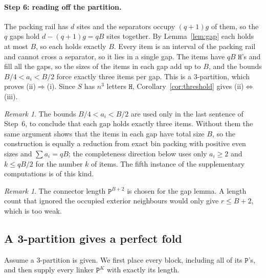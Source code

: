 \documentclass[11pt,letterpaper]{article}
\theoremstyle{definition}
\theoremstyle{remark}
\newtheorem{remark}[theorem]{Remark}
\newcommand{\Hh}{\mathtt{H}}
\newcommand{\Pp}{\mathtt{P}}
\begin{document}
\paragraph{Step 6: reading off the partition.}
The packing rail has $d$ sites and the separators occupy $(q+1)g$ of them, so the $q$ gaps hold
$d-(q+1)g=qB$ sites together. By Lemma~\ref{lem:gap} each holds at most $B$, so each holds exactly
$B$. Every item is an interval of the packing rail and cannot cross a separator, so it lies in a
single gap. The items have $qB$ $\Hh$'s and fill all the gaps, so the sizes of the items in each gap
add up to $B$, and the bounds $B/4<a_i<B/2$ force exactly three items per gap. This is a
3-partition, which proves (ii)$\Rightarrow$(i). Since $S$ has $n^3$ letters $\Hh$,
Corollary~\ref{cor:threshold} gives (ii)$\Leftrightarrow$(iii).

\begin{remark}\label{rem:exact}
The bounds $B/4<a_i<B/2$ are used only in the last sentence of Step~6, to conclude that each gap
holds exactly three items. Without them the same argument shows that the items in each gap have
total size $B$, so the construction is equally a reduction from exact bin packing with positive even
sizes and $\sum a_i=qB$; the completeness direction below uses only $a_i\ge2$ and $k\le qB/2$ for the
number $k$ of items. The fifth instance of the supplementary computations is of this kind.
\end{remark}

\begin{remark}
The connector length $\Pp^{B+2}$ is chosen for the gap lemma. A length count that ignored the occupied
exterior neighbours would only give $r\le B+2$, which is too weak.
\end{remark}

\subsection{A 3-partition gives a perfect fold}

Assume a 3-partition is given. We first place every block, including all of its $\Pp$'s, and then
supply every linker $\Pp^K$ with exactly its length.
\end{document}
